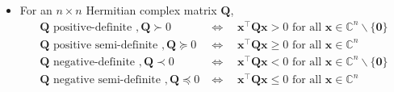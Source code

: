 \documentclass[12pt,thmsa]{article}
\begin{document}
\begin{itemize}
	\item For an \(n \times n\) Hermitian complex matrix \(\boldsymbol{Q}\),
	\begin{equation*}
		\begin{aligned}
			\boldsymbol{Q} \text{ positive-definite }, \boldsymbol{Q} \succ 0 &  \Longleftrightarrow \quad
			\boldsymbol{x}^{\top} \boldsymbol{Q} \boldsymbol{x}>0 \text { for all } \boldsymbol{x} \in \mathbb{C}^n \backslash\{\boldsymbol{0}\} \\
			\boldsymbol{Q}  \text{ positive semi-definite }, \boldsymbol{Q}  \succeq 0 & \Longleftrightarrow \quad \boldsymbol{x}^{\top} \boldsymbol{Q} \boldsymbol{x} \geq 0 \text{ for all } \boldsymbol{x} \in \mathbb{C}^n \\
			\boldsymbol{Q} \text { negative-definite }, \boldsymbol{Q}  \prec 0 & \Longleftrightarrow \quad
			\boldsymbol{x}^{\top} \boldsymbol{Q} \boldsymbol{x}<0 \text { for all } \boldsymbol{x} \in \mathbb{C}^n \backslash\{\boldsymbol{0}\} \\
			\boldsymbol{Q} \text { negative semi-definite }, \boldsymbol{Q}  \preceq 0 &\Longleftrightarrow \quad \boldsymbol{x}^{\top} \boldsymbol{Q} \boldsymbol{x} \leq 0 \text { for all } \boldsymbol{x} \in \mathbb{C}^n
		\end{aligned}
	\end{equation*}
	
\end{itemize}


\end{document}
